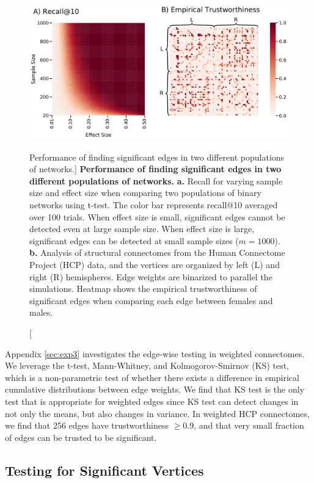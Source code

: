 \begin{figure}
    \centering
    \includegraphics[width=.75\textwidth]{figures/dnd/exp1_final}
    \caption
    [Performance of finding significant edges in two different populations of networks.]
    {\textbf{Performance of finding significant edges in two different populations of networks.}
    \textbf{a.} Recall for varying sample size and effect size when comparing two populations of binary networks using t-test.
    The color bar represents recall@10 averaged over 100 trials. 
    When effect size is small, significant edges cannot be detected even at large sample size. When effect size is large, significant edges can be detected at small sample sizes ($m=1000$). 
    \textbf{b.} Analysis of structural connectomes from the Human Connectome Project (HCP) data, and the vertices are organized by left (L) and right (R) hemispheres. Edge weights are binarized to parallel the simulations. Heatmap shows the empirical trustworthiness of significant edges when comparing each edge between females and males.}
    \label{fig:exp1}
\end{figure}

Appendix \ref{sec:exp3} investigates the edge-wise testing in weighted connectomes. We leverage the t-test, Mann-Whitney, and Kolmogorov-Smirnov (KS) test, which is a non-parametric test of whether there exists a difference in empirical cumulative distributions between edge weights. We find that KS test is the only test that is appropriate for weighted edges since KS test can detect changes in not only the means, but also changes in variance. In weighted HCP connectomes, we find that 256 edges have trustworthiness $\geq 0.9$, and that very small fraction of edges can be trusted to be significant.

\subsection{Testing for Significant Vertices}

